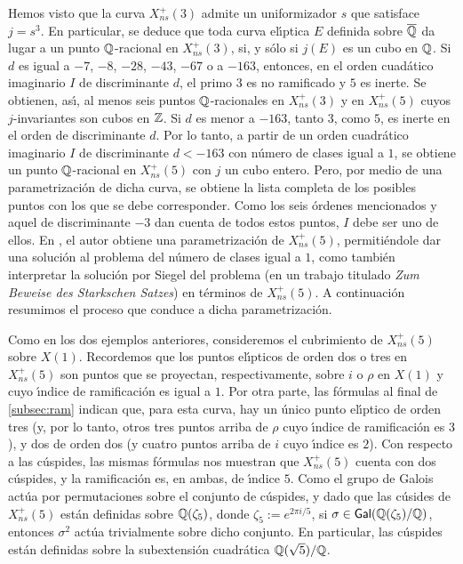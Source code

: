 

Hemos visto que la curva $X_{ns}^{+}(3)$ admite un uniformizador $s$
que satisface $j=s^{3}$. En particular,
se deduce que toda curva el\'{\i}ptica $E$ definida sobre
$\overline{\mathbb{Q}}$ da lugar a un punto $\mathbb{Q}$-racional en
$X_{ns}^{+}(3)$, si, y s\'{o}lo si $j(E)$ es un cubo en $\mathbb{Q}$.
Si $d$ es igual a $-7$, $-8$, $-28$, $-43$, $-67$ o a $-163$, entonces, en
el orden cuad\'{a}tico imaginario $I$ de discriminante $d$, el primo $3$ es
no ramificado y $5$ es inerte. Se obtienen, as\'{\i}, al menos seis
puntos $\mathbb{Q}$-racionales en $X_{ns}^{+}(3)$ y en $X_{ns}^{+}(5)$ cuyos
$j$-invariantes son cubos en $\mathbb{Z}$. Si $d$ es menor a $-163$, tanto
$3$, como $5$, es inerte en el orden de discriminante $d$. Por lo tanto,
a partir de un orden cuadr\'{a}tico imaginario $I$ de discriminante $d<-163$
con n\'{u}mero de clases igual a $1$, se obtiene un punto $\mathbb{Q}$-racional
en $X_{ns}^{+}(5)$ con $j$ un cubo entero. Pero, por medio de una
parametrizaci\'{o}n de dicha curva, se obtiene la lista completa de los
posibles puntos con los que se debe corresponder. Como los seis \'{o}rdenes
mencionados y aquel de discriminante $-3$ dan cuenta de todos estos puntos,
$I$ debe ser uno de ellos. En \cite{chenLevelFive}, el autor obtiene una
parametrizaci\'{o}n de $X_{ns}^{+}(5)$, permiti\'{e}ndole dar una
soluci\'{o}n al problema del n\'{u}mero de clases igual a $1$, como
tambi\'{e}n interpretar la soluci\'{o}n por Siegel del problema
(en un trabajo titulado \textit{Zum Beweise des Starkschen Satzes})
en t\'{e}rminos de $X_{ns}^{+}(5)$. A continuaci\'{o}n
resumimos el proceso que conduce a dicha parametrizaci\'{o}n.

Como en los dos ejemplos anteriores, consideremos el cubrimiento de
$X_{ns}^{+}(5)$ sobre $X(1)$. Recordemos que los puntos el\'{\i}pticos de
orden dos o tres en $X_{ns}^{+}(5)$ son puntos que se proyectan, respectivamente,
sobre $i$ o $\rho$ en $X(1)$ y cuyo \'{\i}ndice de ramificaci\'{o}n es igual a $1$.
Por otra parte, las f\'{o}rmulas al final de \ref{subsec:ram} indican que, para
esta curva, hay un \'{u}nico punto el\'{\i}ptico de orden tres (y, por lo tanto,
otros tres puntos arriba de $\rho$ cuyo \'{\i}ndice de ramificaci\'{o}n es $3$),
y dos de orden dos (y cuatro puntos arriba de $i$ cuyo \'{\i}ndice es $2$). Con
respecto a las c\'{u}spides, las mismas f\'{o}rmulas nos muestran que
$X_{ns}^{+}(5)$ cuenta con dos c\'{u}spides, y la ramificaci\'{o}n es, en ambas,
de \'{\i}ndice $5$.
%
Como el grupo de Galois act\'{u}a por permutaciones sobre el conjunto de
c\'{u}spides, y dado que las c\'{u}sides de $X_{ns}^{+}(5)$ est\'{a}n
definidas sobre $\mathbb{Q}(\zeta_{5})$, donde $\zeta_{5}:=e^{2\pi i/5}$,
si $\sigma\in\mathsf{Gal}(\mathbb{Q}(\zeta_{5})/\mathbb{Q})$, entonces $\sigma^{2}$
act\'{u}a trivialmente sobre dicho conjunto. En particular, las c\'{u}spides
est\'{a}n definidas sobre la subextensi\'{o}n cuadr\'{a}tica
$\mathbb{Q}(\sqrt{5})/\mathbb{Q}$.

